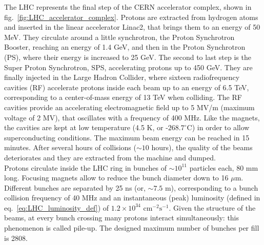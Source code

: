 \noindent The LHC represents the final step of the CERN accelerator complex, shown in fig.~\ref{fig:LHC_accelerator_complex}. Protons are extracted from hydrogen atoms and inserted in the linear accelerator Linac2, that brings them to an energy of 50 MeV. They circulate around a little synchrotron, the Proton Synchrotron Booster, reaching an energy of 1.4 GeV, and then in the Proton Synchrotron (PS), where their energy is increased to 25 GeV. The second to last step is the Super Proton Synchrotron, SPS, accelerating protons up to 450 GeV. They are finally injected in the Large Hadron Collider, where sixteen radiofrequency cavities (RF) accelerate protons inside each beam up to an energy of 6.5 TeV, corresponding to a center-of-mass energy of 13 TeV when colliding. The RF cavities provide an accelerating electromagnetic field up to 5 MV/m (maximum voltage of 2 MV), that oscillates with a frequency of 400 MHz. Like the magnets, the cavities are kept at low temperature (4.5 K, or -$268.7^{\circ}$C) in order to allow superconducting conditions. The maximum beam energy can be reached in 15 minutes. After several hours of collisions ($\sim 10$ hours), the quality of the beams deteriorates and they are extracted from the machine and dumped.\\

\noindent Protons circulate inside the LHC ring in bunches of $\sim10^{11}$ particles each, 80 mm long. Focusing magnets allow to reduce the bunch diameter down to 16 $\mu$m. Different bunches are separated by 25 ns (or, $\sim 7.5$ m), corresponding to a bunch collision frequency of 40 MHz and an instantaneous (peak) luminosity (defined in eq.~\ref{eq:LHC_luminosity_def}) of $1.2 \times 10^{34}\mbox{ cm}^{-2} \mbox{s}^{-1}$. Given the structure of the beams, at every bunch crossing many protons interact simultaneously: this phenomenon is called pile-up. The designed maximum number of bunches per fill is 2808.\\

